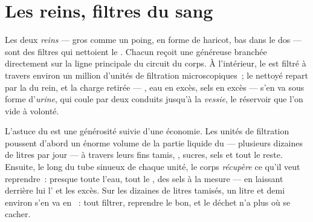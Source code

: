 \section{Les reins, filtres du sang}

\begin{definition}\label{def:g7:removing-wastes:kidneys}
Les deux \emph{reins} --- gros comme un poing, en forme
de haricot, bas dans le dos --- sont des filtres qui nettoient le
. Chacun reçoit une  généreuse branchée directement sur la
ligne principale du circuit du corps. À l'intérieur, le  est
filtré à travers environ un million d'unités de filtration
microscopiques~; le  nettoyé repart par la  du rein, et la
charge retirée --- , eau en excès, sels en excès --- s'en va
sous forme d'\emph{urine}, qui coule par deux conduits
jusqu'à la \emph{vessie}, le réservoir que l'on vide à
volonté.
\end{definition}

\begin{proposition}\label{prop:g7:removing-wastes:filter}
L'astuce du  est une générosité suivie d'une économie. Les
unités de filtration poussent d'abord un énorme volume de la partie
liquide du  --- plusieurs dizaines de litres par jour --- à
travers leurs fins tamis, , sucres, sels et tout le reste.
Ensuite, le long du tube sinueux de chaque unité, le corps
\emph{récupère} ce qu'il veut reprendre~: presque toute l'eau, tout
le , des sels à la mesure --- en laissant derrière lui l'
et les excès. Sur les dizaines de litres tamisés, un litre et demi
environ s'en va en ~: tout filtrer, reprendre le bon, et le
déchet n'a plus où se cacher.
\end{proposition}
\admitted

